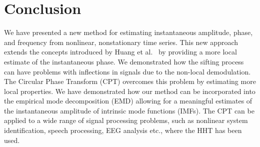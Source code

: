 \documentclass[a4paper]{IEEEtran}
\begin{document}


\section{Conclusion}\label{sect:ConclusionSection}
We have presented a new method for estimating instantaneous amplitude, phase, and frequency from nonlinear, nonstationary time series. This new approach extends the concepts introduced by Huang et al.~\cite{Huang1998} by providing a more local estimate of the instantaneous phase. We demonstrated how the sifting process can have problems with inflections in signals due to the non-local demodulation. The Circular Phase Transform (CPT) overcomes this problem by estimating more local properties. We have demonstrated how our method can be incorporated into the empirical mode decomposition (EMD) allowing for a meaningful estimates of the instantaneous amplitude of intrinsic mode functions (IMFs). The CPT can be applied to a wide range of signal processing problems, such as nonlinear system identification, speech processing, EEG analysis etc., where the HHT has been used. 


\end{document}
